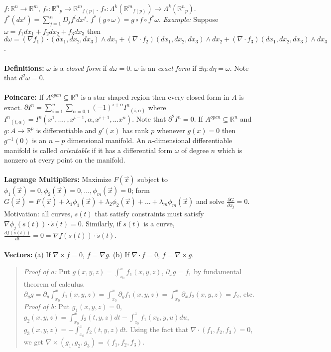 $f: {\mathbb R}^n \rightarrow {\mathbb R}^m$, $f_*: {{\mathbb R}^n}_p \rightarrow {{\mathbb R}^m}_{f(p)}$.
$f_* : \Lambda^k ({{\mathbb R}^m}_{f(p)}) \rightarrow \Lambda^k({{\mathbb R}^n}_p )$.
$f^*(dx^i) = \sum_{j=1}^n D_j f^i dx^j$.  $f^* (g \circ \omega ) = g \circ f \circ 
f^* \omega$. \emph{Example:} Suppose
$\omega= f_1 dx_1 + f_2 dx_2 + f_3 dx_3 $ then
$d\omega= (\nabla f_1) \cdot (dx_1, dx_2, dx_3) \wedge dx_1 +
(\nabla \cdot f_2) (dx_1, dx_2, dx_3) \wedge dx_2 +
(\nabla \cdot f_3) (dx_1, dx_2, dx_3) \wedge dx_3$.
\\
\\
{\bf Definitions:}
$\omega$ is a \emph{closed form} if $d \omega = 0$.
$\omega$ is an \emph{exact form} if $\exists \eta: d \eta = \omega$.
Note that $d^2 \omega = 0$.
\\
\\
{\bf Poincare:}  If $A^{open} \subseteq {\mathbb R}^n$ is a star 
shaped region then every closed form in $A$ is exact.
$\partial I^n= \sum_{i=1}^n \sum_{\alpha = 0,1} (-1)^{i+ \alpha} {I^n}_{(i, \alpha)}$ where
${I^n}_{(i, \alpha)}= I^n(x^1 , ... , , x^{i-1}, \alpha , x^{i+1} , ... x^n )$.
Note that $\partial^2 I^n = 0$.
If $A^{open} \subseteq {\mathbb R}^n$ and $g: A \rightarrow {\mathbb R}^p$ 
is differentiable and $g'(x)$ has
rank $p$ whenever $g(x)= 0$ then $g^{-1}(0)$ is an $n-p$ dimensional manifold.
An $n$-dimensional differentiable manifold is called \emph{orientable}
if it has a differential form $\omega$ 
of degree $n$ which is nonzero at every point on the manifold.
\\
\\
{\bf Lagrange Multipliers:} Maximize 
$F({\vec x})$ subject to
$\phi_1({\vec x})=0, \phi_2({\vec x})=0, \ldots , \phi_m({\vec x})=0$;
form 
$G({\vec x})= F({\vec x})+ \lambda_1 \phi_1({\vec x}) + \lambda_2 \phi_2({\vec x}) + 
\ldots + \lambda_m \phi_m({\vec x})$ and  solve
${\frac {\partial G} {\partial x_j}}=0$.  Motivation: all curves, $s(t)$ that satisfy constraints
must satisfy $\nabla \phi_j(s(t)) \cdot \dot{s}(t) = 0$.  Similarly, if $s(t)$ is a curve,
${\frac {df(s(t))} {dt}} = 0 = \nabla f(s(t)) \cdot \dot{s}(t)$.
\\
\\
{\bf Vectors:} 
(a) If $\nabla \times f = 0$, $f= \nabla g$.
(b) If $\nabla \cdot f = 0$, $f= \nabla \times g$.
\begin{quote}
\emph{Proof of a:}  Put $g(x,y,z)= \int_{x_0}^x f_1(x,y,z)$,
$\partial_x g= f_1$ by fundamental theorem of calculus.
$\partial_y g= \partial_y \int_{x_0}^x f_1(x,y,z)=
\int_{x_0}^x \partial_y f_1(x,y,z)= \int_{x_0}^x \partial_x f_2(x,y,z)= f_2$, etc.
\\
\emph{Proof of b:}  
Put $g_1(x,y,z)= 0$,
$g_2(x,y,z)= \int_{x_0}^x f_3(t,y,z) dt - \int_{z_0}^z f_1(x_0, y, u) du$,
$g_3(x,y,z)= - \int_{x_0}^x f_2(t,y,z) dt$.  Using the fact that $\nabla \cdot (f_1, f_2, f_3)=0$,
we get $\nabla \times (g_1, g_2, g_3) = (f_1, f_2, f_3)$.
\end{quote}
